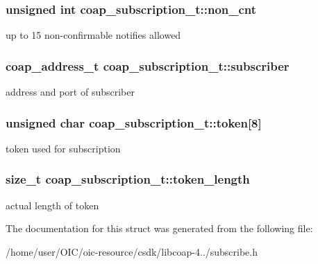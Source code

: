 \subsubsection[{non\+\_\+cnt}]{\setlength{\rightskip}{0pt plus 5cm}unsigned int coap\+\_\+subscription\+\_\+t\+::non\+\_\+cnt}\label{structcoap__subscription__t_a8c83fc8034daa9f5c88b943698eeb466}
up to 15 non-\/confirmable notifies allowed \hypertarget{structcoap__subscription__t_aee4d3dad6a6721ecd018c19bb1bf6c92}{}
\subsubsection[{subscriber}]{\setlength{\rightskip}{0pt plus 5cm}coap\+\_\+address\+\_\+t coap\+\_\+subscription\+\_\+t\+::subscriber}\label{structcoap__subscription__t_aee4d3dad6a6721ecd018c19bb1bf6c92}
address and port of subscriber \hypertarget{structcoap__subscription__t_a2945242d243578ad07362355b3e68c2d}{}
\subsubsection[{token}]{\setlength{\rightskip}{0pt plus 5cm}unsigned char coap\+\_\+subscription\+\_\+t\+::token\mbox{[}8\mbox{]}}\label{structcoap__subscription__t_a2945242d243578ad07362355b3e68c2d}
token used for subscription \hypertarget{structcoap__subscription__t_a91ab09d2d6b7ac8d2cc19fcaa64a45c1}{}
\subsubsection[{token\+\_\+length}]{\setlength{\rightskip}{0pt plus 5cm}size\+\_\+t coap\+\_\+subscription\+\_\+t\+::token\+\_\+length}\label{structcoap__subscription__t_a91ab09d2d6b7ac8d2cc19fcaa64a45c1}
actual length of token 

The documentation for this struct was generated from the following file\+:\begin{DoxyCompactItemize}
\item 
/home/user/\+O\+I\+C/oic-\/resource/csdk/libcoap-\/4../subscribe.\+h\end{DoxyCompactItemize}
